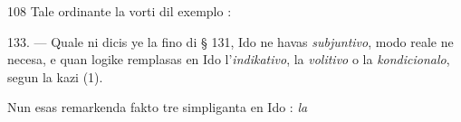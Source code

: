\begin{VUpage}[112]{108}
Tale ordinante la vorti dil exemplo : \nl
{}\nl
{}

\VUblanc{5.88pt}%
133. --- Quale ni dicis ye la fino di § 131, Ido ne havas\nl
\textit{subjuntivo}, modo reale ne necesa, e quan logike remplasas\nl
en Ido l'\textit{indikativo}, la \textit{volitivo} o la \textit{kondicionalo}, segun la\nl
kazi (1).

Nun esas remarkenda fakto tre simpliganta en Ido : \textit{la}\parplein
\end{VUpage}

